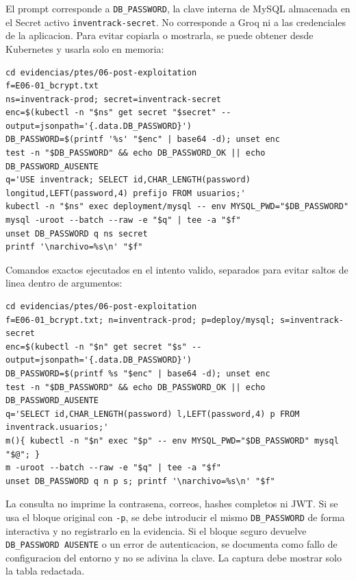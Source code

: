 El prompt corresponde a \texttt{DB\_PASSWORD}, la clave interna de MySQL almacenada en el Secret activo \texttt{inventrack-secret}. No corresponde a Groq ni a las credenciales de la aplicacion. Para evitar copiarla o mostrarla, se puede obtener desde Kubernetes y usarla solo en memoria:

\begin{tcolorbox}[codebox]
\begin{Verbatim}[fontsize=\scriptsize,breaklines=true,breakanywhere=true]
cd evidencias/ptes/06-post-exploitation
f=E06-01_bcrypt.txt
ns=inventrack-prod; secret=inventrack-secret
enc=$(kubectl -n "$ns" get secret "$secret" --output=jsonpath='{.data.DB_PASSWORD}')
DB_PASSWORD=$(printf '%s' "$enc" | base64 -d); unset enc
test -n "$DB_PASSWORD" && echo DB_PASSWORD_OK || echo DB_PASSWORD_AUSENTE
q='USE inventrack; SELECT id,CHAR_LENGTH(password) longitud,LEFT(password,4) prefijo FROM usuarios;'
kubectl -n "$ns" exec deployment/mysql -- env MYSQL_PWD="$DB_PASSWORD" mysql -uroot --batch --raw -e "$q" | tee -a "$f"
unset DB_PASSWORD q ns secret
printf '\narchivo=%s\n' "$f"
\end{Verbatim}
\end{tcolorbox}

Comandos exactos ejecutados en el intento valido, separados para evitar saltos de linea dentro de argumentos:

\begin{tcolorbox}[codebox]
\begin{Verbatim}[fontsize=\scriptsize,breaklines=true,breakanywhere=true]
cd evidencias/ptes/06-post-exploitation
f=E06-01_bcrypt.txt; n=inventrack-prod; p=deploy/mysql; s=inventrack-secret
enc=$(kubectl -n "$n" get secret "$s" --output=jsonpath='{.data.DB_PASSWORD}')
DB_PASSWORD=$(printf %s "$enc" | base64 -d); unset enc
test -n "$DB_PASSWORD" && echo DB_PASSWORD_OK || echo DB_PASSWORD_AUSENTE
q='SELECT id,CHAR_LENGTH(password) l,LEFT(password,4) p FROM inventrack.usuarios;'
m(){ kubectl -n "$n" exec "$p" -- env MYSQL_PWD="$DB_PASSWORD" mysql "$@"; }
m -uroot --batch --raw -e "$q" | tee -a "$f"
unset DB_PASSWORD q n p s; printf '\narchivo=%s\n' "$f"
\end{Verbatim}
\end{tcolorbox}

La consulta no imprime la contrasena, correos, hashes completos ni JWT. Si se usa el bloque original con \texttt{-p}, se debe introducir el mismo \texttt{DB\_PASSWORD} de forma interactiva y no registrarlo en la evidencia. Si el bloque seguro devuelve \texttt{DB\_PASSWORD\ AUSENTE} o un error de autenticacion, se documenta como fallo de configuracion del entorno y no se adivina la clave. La captura debe mostrar solo la tabla redactada.

